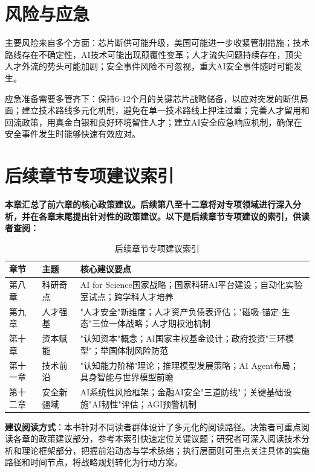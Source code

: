 \section{风险与应急}

主要风险来自多个方面：芯片断供可能升级，美国可能进一步收紧管制措施；技术路线存在不确定性，AI技术可能出现颠覆性变革；人才流失问题持续存在，顶尖人才外流的势头可能加剧；安全事件风险不可忽视，重大AI安全事件随时可能发生。

应急准备需要多管齐下：保持6-12个月的关键芯片战略储备，以应对突发的断供局面；建立技术路线多元化机制，避免在单一技术路线上押注过重；完善人才留用和回流政策，用真金白银和良好环境留住人才；建立AI安全应急响应机制，确保在安全事件发生时能够快速有效应对。

\section{后续章节专项建议索引}

\textbf{本章汇总了前六章的核心政策建议。后续第八至十二章将对专项领域进行深入分析，并在各章末尾提出针对性的政策建议。以下是后续章节专项建议的索引，供读者查阅：}

\begin{table}[H]
\centering
\caption{后续章节专项建议索引}
\small
\begin{tabular}{p{1.5cm}p{3.5cm}p{7.5cm}}
\toprule
\textbf{章节} & \textbf{主题} & \textbf{核心建议要点} \\
\midrule
第八章 & 科研奇点 & AI for Science国家战略；国家科研AI平台建设；自动化实验室试点；跨学科人才培养 \\
\midrule
第九章 & 人才强基 & "人才安全"新维度；人才资产负债表评估；"磁吸-锚定-生态"三位一体战略；人才期权池机制 \\
\midrule
第十章 & 资本赋能 & "认知资本"概念；AI国家主权基金设计；政府投资"三环模型"；举国体制风险防范 \\
\midrule
第十一章 & 技术前沿 & "认知能力阶梯"理论；推理模型发展策略；AI Agent布局；具身智能与世界模型前瞻 \\
\midrule
第十二章 & 安全新疆域 & AI系统性风险框架；金融AI安全"三道防线"；关键基础设施"AI韧性"评估；AGI预警机制 \\
\bottomrule
\end{tabular}
\end{table}

\textbf{建议阅读方式}：本书针对不同读者群体设计了多元化的阅读路径。决策者可重点阅读各章的政策建议部分，参考本索引快速定位关键议题；研究者可深入阅读技术分析和理论框架部分，把握前沿动态与学术脉络；执行层面则可重点关注具体的实施路径和时间节点，将战略规划转化为行动方案。

